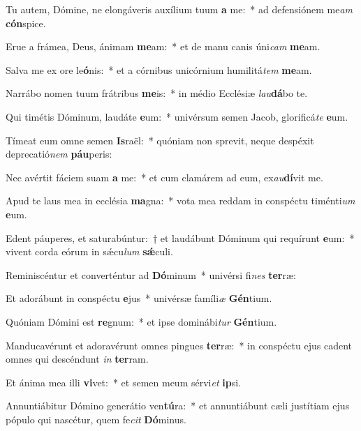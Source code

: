 \item Tu autem, Dómine, ne elongáveris auxílium tuum \textbf{a} me:~* ad defensiónem me\textit{am} \textbf{cón}spice.
\item Erue a frámea, Deus, ánimam \textbf{me}am:~* et de manu canis úni\textit{cam} \textbf{me}am.
\item Salva me ex ore le\textbf{ó}nis:~* et a córnibus unicórnium humilitá\textit{tem} \textbf{me}am.
\item Narrábo nomen tuum frátribus \textbf{me}is:~* in médio Ecclésiæ \textit{lau}\textbf{dá}bo te.
\item Qui timétis Dóminum, laudáte \textbf{e}um:~* univérsum semen Jacob, glorificá\textit{te} \textbf{e}um.
\item Tímeat eum omne semen \textbf{Is}raël:~* quóniam non sprevit, neque despéxit deprecatió\textit{nem} \textbf{páu}peris:
\item Nec avértit fáciem suam \textbf{a} me:~* et cum clamárem ad eum, ex\textit{au}\textbf{dí}vit me.
\item Apud te laus mea in ecclésia \textbf{ma}gna:~* vota mea reddam in conspéctu timénti\textit{um} \textbf{e}um.
\item Edent páuperes, et saturabúntur:~† et laudábunt Dóminum qui requírunt \textbf{e}um:~* vivent corda eórum in sǽcu\textit{lum} \textbf{sǽ}culi.
\item Reminiscéntur et converténtur ad \textbf{Dó}minum~* univérsi fi\textit{nes} \textbf{ter}ræ:
\item Et adorábunt in conspéctu \textbf{e}jus~* univérsæ famíli\textit{æ} \textbf{Gén}tium.
\item Quóniam Dómini est \textbf{re}gnum:~* et ipse dominábi\textit{tur} \textbf{Gén}tium.
\item Manducavérunt et adoravérunt omnes pingues \textbf{ter}ræ:~* in conspéctu ejus cadent omnes qui descéndunt \textit{in} \textbf{ter}ram.
\item Et ánima mea illi \textbf{vi}vet:~* et semen meum sérvi\textit{et} \textbf{ip}si.
\item Annuntiábitur Dómino generátio ven\textbf{tú}ra:~* et annuntiábunt cæli justítiam ejus pópulo qui nascétur, quem fe\textit{cit} \textbf{Dó}minus.
